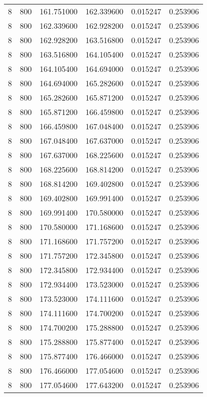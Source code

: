\begin{longtable}{rrrrrr}
8 & 800 & 161.751000 & 162.339600 & 0.015247 & 0.253906 \\
8 & 800 & 162.339600 & 162.928200 & 0.015247 & 0.253906 \\
8 & 800 & 162.928200 & 163.516800 & 0.015247 & 0.253906 \\
8 & 800 & 163.516800 & 164.105400 & 0.015247 & 0.253906 \\
8 & 800 & 164.105400 & 164.694000 & 0.015247 & 0.253906 \\
8 & 800 & 164.694000 & 165.282600 & 0.015247 & 0.253906 \\
8 & 800 & 165.282600 & 165.871200 & 0.015247 & 0.253906 \\
8 & 800 & 165.871200 & 166.459800 & 0.015247 & 0.253906 \\
8 & 800 & 166.459800 & 167.048400 & 0.015247 & 0.253906 \\
8 & 800 & 167.048400 & 167.637000 & 0.015247 & 0.253906 \\
8 & 800 & 167.637000 & 168.225600 & 0.015247 & 0.253906 \\
8 & 800 & 168.225600 & 168.814200 & 0.015247 & 0.253906 \\
8 & 800 & 168.814200 & 169.402800 & 0.015247 & 0.253906 \\
8 & 800 & 169.402800 & 169.991400 & 0.015247 & 0.253906 \\
8 & 800 & 169.991400 & 170.580000 & 0.015247 & 0.253906 \\
8 & 800 & 170.580000 & 171.168600 & 0.015247 & 0.253906 \\
8 & 800 & 171.168600 & 171.757200 & 0.015247 & 0.253906 \\
8 & 800 & 171.757200 & 172.345800 & 0.015247 & 0.253906 \\
8 & 800 & 172.345800 & 172.934400 & 0.015247 & 0.253906 \\
8 & 800 & 172.934400 & 173.523000 & 0.015247 & 0.253906 \\
8 & 800 & 173.523000 & 174.111600 & 0.015247 & 0.253906 \\
8 & 800 & 174.111600 & 174.700200 & 0.015247 & 0.253906 \\
8 & 800 & 174.700200 & 175.288800 & 0.015247 & 0.253906 \\
8 & 800 & 175.288800 & 175.877400 & 0.015247 & 0.253906 \\
8 & 800 & 175.877400 & 176.466000 & 0.015247 & 0.253906 \\
8 & 800 & 176.466000 & 177.054600 & 0.015247 & 0.253906 \\
8 & 800 & 177.054600 & 177.643200 & 0.015247 & 0.253906 \\

\end{longtable}
